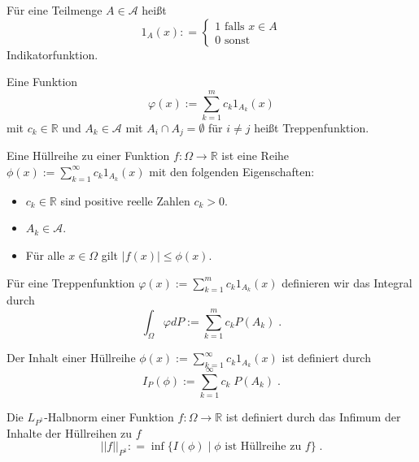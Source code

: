 \begin{Definition}
Für eine Teilmenge $A \in \mathcal{A}$ heißt
$$ 1_A (x): = \begin{cases} 1 \text{  falls }   x \in A  \\  0  \text{  sonst}  \end{cases}$$
Indikatorfunktion.
\end{Definition}

\begin{Definition}
Eine Funktion 
$$ \varphi(x) := \sum_{k=1}^m c_k 1_{A_k}(x)$$ mit $c_k \in \mathbb{R}$ und $A_k \in \mathcal{A}$ mit $A_i \cap A_j = \emptyset$ für $i \neq j$
heißt Treppenfunktion.
\end{Definition}





\begin{Definition}
Eine Hüllreihe zu einer Funktion $f :\Omega \to \mathbb{R}$ ist eine Reihe $\phi(x):= \sum_{k=1}^{\infty} c_k  1_{A_k} (x)$ mit den folgenden Eigenschaften:
\begin{itemize}
\item $c_k \in \mathbb{R}$ sind positive reelle Zahlen $c_k >0$.
\item $A_k \in \mathcal{A}$.
\item Für alle $x \in \Omega$ gilt $|f(x) | \leq \phi(x)$.
\end{itemize}
\end{Definition}

 
\begin{Definition}
Für eine Treppenfunktion $ \varphi(x) := \sum_{k=1}^m c_k 1_{A_k}(x)$ definieren wir das Integral durch
$$\int_{\Omega} \varphi dP := \sum_{k =1}^m  c_k P(A_k) \; . $$
\end{Definition}


\begin{Definition}
Der Inhalt einer Hüllreihe $\phi(x):= \sum_{k=1}^{\infty} c_k  1_{A_k} (x)$ ist definiert durch 
$$I_P (\phi) := \sum_{k=1}^{\infty} c_k \;  P(A_k) \; .$$
\end{Definition}


\begin{Definition}
Die $L_{P^1}$-Halbnorm einer Funktion $f : \Omega\to \mathbb{R}$ ist definiert durch das Infimum der Inhalte der Hüllreihen zu $f$
$$ || f ||_{P^1} : = \inf  \biggl \{   I(\phi) \; | \; \phi  \text{ ist Hüllreihe zu  }  f \biggr \} \; .$$
\end{Definition}



